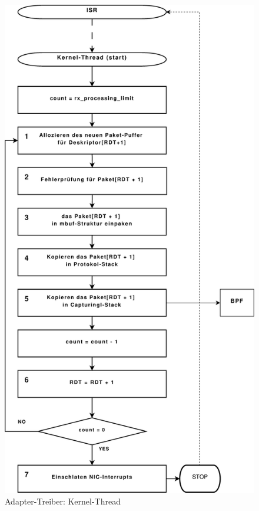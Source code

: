 {\begin{figure}
\centering \includegraphics[width=4.5in]{bilder/FlowChart_Kernel_Thread}
\caption{Adapter-Treiber: Kernel-Thread}
\label{img:isr_kern_thr}
\end{figure} 

}
%
